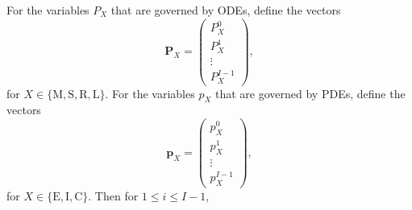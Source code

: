 \documentclass[12pt]{article}
\renewcommand{\vec}[1]{\mathbf{#1}}
\begin{document}
For the variables $P_X$ that are governed by ODEs,
define the vectors
\begin{equation}
  \vec{P}_X =
  \begin{pmatrix}
    P_X^0\\
    P_X^1\\
    \vdots\\
    P_X^{I - 1}
  \end{pmatrix},
\end{equation}
for $X \in \{\mathrm{M}, \mathrm{S}, \mathrm{R}, \mathrm{L}\}$.
For the variables $p_X$ that are governed by PDEs,
define the vectors
\begin{equation}
  \vec{p}_X =
  \begin{pmatrix}
    p_X^0\\
    p_X^1\\
    \vdots\\
    p_X^{I - 1}
  \end{pmatrix},
\end{equation}
for $X \in \{\mathrm{E}, \mathrm{I}, \mathrm{C}\}$.
Then for $1 \leq i \leq I - 1$,
\end{document}
